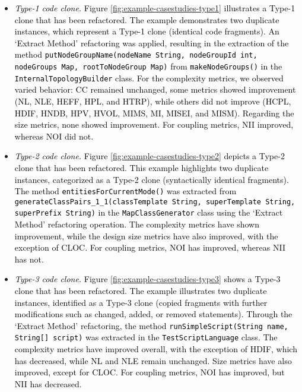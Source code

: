 \begin{itemize}
    \item \textcolor{black}{\textit{Type-1 code clone.} Figure \ref{fig:example-casestudies-type1} illustrates a Type-1 clone that has been refactored. The example demonstrates two duplicate instances, which represent a Type-1 clone (\ie identical code fragments). An `Extract Method' refactoring was applied, resulting in the extraction of the method \texttt{putNodeGroup\break Name(nodeName String, nodeGroupId int, nodeGroups Map, rootTo\break NodeGroup Map)} from \texttt{makeNodeGroups()} in the \texttt{InternalTopologyBuilder} class. For the complexity metrics, we observed varied behavior: CC remained unchanged, some metrics showed improvement (NL, NLE, HEFF, HPL, and HTRP), while others did not improve (HCPL, HDIF, HNDB, HPV, HVOL, MIMS, MI, MISEI, and MISM). Regarding the size metrics, none showed improvement. For coupling metrics, NII improved, whereas NOI did not.} %
    \item \textcolor{black}{\textit{Type-2 code clone.} Figure \ref{fig:example-casestudies-type2} depicts a Type-2 clone that has been refactored. This example highlights two duplicate instances, categorized as a Type-2 clone (\ie syntactically identical fragments). The method \texttt{entitiesForCurrentMode()} was extracted from \texttt{generateClassPairs\_1\_1\break (classTemplate String, superTemplate String, superPrefix String)} in the \texttt{MapClassGenerator} class using the `Extract Method' refactoring operation. The complexity metrics have shown improvement, while the design size metrics have also improved, with the exception of CLOC. For coupling metrics, NOI has improved, whereas NII has not.}
    \item \textcolor{black}{\textit{Type-3 code clone.} Figure \ref{fig:example-casestudies-type3} shows a Type-3 clone that has been refactored. The example illustrates two duplicate instances, identified as a Type-3 clone (\ie copied fragments with further modifications such as changed, added, or removed statements). Through the `Extract Method' refactoring, the method \texttt{runSimpleScript(String name, String[] script)}  was extracted in the \texttt{TestScriptLanguage} class. The complexity metrics have improved overall, with the exception of HDIF, which has decreased, while NL and NLE remain unchanged. Size metrics have also improved, except for CLOC. For coupling metrics, NOI has improved, but NII has decreased. }
\end{itemize}








